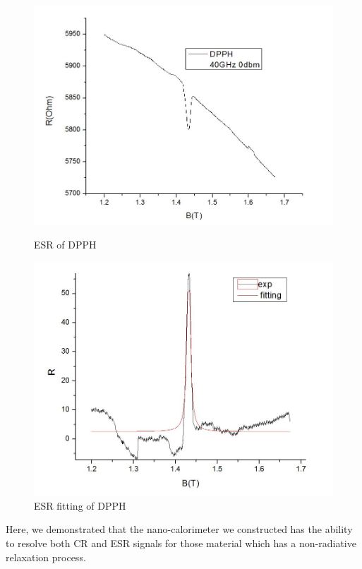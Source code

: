 \documentclass[12pt]{ruthesis}
\begin{document}
\begin{figure}[!htb]\centering
   \begin{minipage}{0.49\textwidth}
     \includegraphics[width=\linewidth]{figures/dpph_esr.JPG}
     \caption{ESR of DPPH}\label{dpph_esr}
   \end{minipage}
   \begin {minipage}{0.49\textwidth}
     \includegraphics[width=\linewidth]{figures/dpph_fitting.JPG}
     \caption{ESR fitting of DPPH}\label{dpph_fitting}
   \end{minipage}
\end{figure}
 

Here, we demonstrated that the nano-calorimeter we constructed has the ability to resolve both CR and ESR signals for those material which has a non-radiative relaxation process. 
\end{document}
